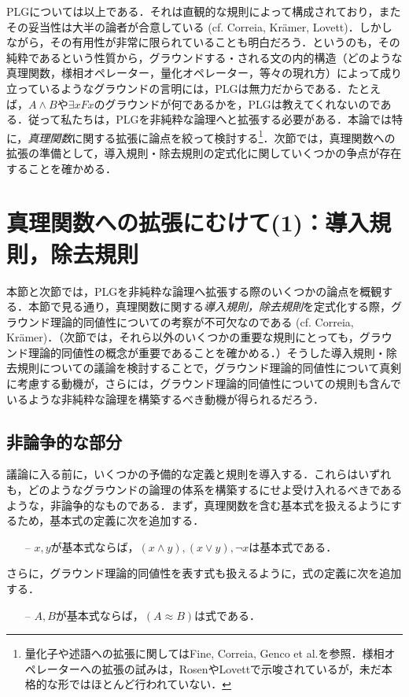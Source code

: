 \documentclass[twoside,14Q,uplatex,dvipdfmx]{jsarticle}
\theoremstyle{definition}
\begin{document}
\textsc{PLG}については以上である．それは直観的な規則によって構成されており，またその妥当性は大半の論者が合意している (cf. Correia\cite{Correia2010,Correia2014,Correia2017}, Kr\"{a}mer\cite{Kramer2018,Kramer2021}, Lovett\cite{Lovett2020})．しかしながら，その有用性が非常に限られていることも明白だろう．というのも，その純粋であるという性質から，グラウンドする・される文の内的構造（どのような真理関数，様相オペレーター，量化オペレーター，等々の現れ方）によって成り立っているようなグラウンドの言明には，\textsc{PLG}は無力だからである．たとえば，$A\land B$や$\exists xFx$のグラウンドが何であるかを，\textsc{PLG}は教えてくれないのである．従って私たちは，\textsc{PLG}を非純粋な論理へと拡張する必要がある．本論では特に，\emph{真理関数}に関する拡張に論点を絞って検討する\footnote{量化子や述語への拡張に関してはFine\cite{Fine2012a}, Correia\cite{Correia2014}, Genco et al.\cite{Gencoetal2021}を参照．様相オペレーターへの拡張の試みは，Rosen\cite{Rosen2010}やLovett\cite{Lovett2020}で示唆されているが，未だ本格的な形ではほとんど行われていない．}．次節では，真理関数への拡張の準備として，導入規則・除去規則の定式化に関していくつかの争点が存在することを確かめる．
%
%
%
\section{真理関数への拡張にむけて(1)：導入規則，除去規則}\label{truthfunction}
本節と次節では，\textsc{PLG}を非純粋な論理へ拡張する際のいくつかの論点を概観する．本節で見る通り，真理関数に関する\emph{導入規則，除去規則}を定式化する際，グラウンド理論的同値性についての考察が不可欠なのである (cf. Correia\cite{Correia2017}, Kr\"{a}mer\cite{Kramer2018,Kramer2021})．（次節では，それら以外のいくつかの重要な規則にとっても，グラウンド理論的同値性の概念が重要であることを確かめる．）そうした導入規則・除去規則についての議論を検討することで，グラウンド理論的同値性について真剣に考慮する動機が，さらには，グラウンド理論的同値性についての規則も含んでいるような非純粋な論理を構築するべき動機が得られるだろう．

\subsection{非論争的な部分}
議論に入る前に，いくつかの予備的な定義と規則を導入する．これらはいずれも，どのようなグラウンドの論理の体系を構築するにせよ受け入れるべきであるような，非論争的なものである．まず，真理関数を含む基本式を扱えるようにするため，基本式の定義に次を追加する．
	\begin{itemize}
	\item[--] $x, y$が基本式ならば，$(x\land y), (x\lor y), \lnot x$は基本式である．
	\end{itemize}
さらに，グラウンド理論的同値性を表す式も扱えるように，式の定義に次を追加する．
	\begin{itemize}
	\item[--] $A, B$が基本式ならば，$(A\approx B)$は式である．
	\end{itemize}
\end{document}

